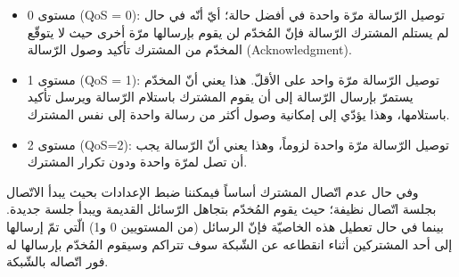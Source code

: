 \begin{itemize}
	\item مستوى 0 (QoS = 0): توصيل الرّسالة مرّة واحدة في أفضل حالة؛ أيّ أنّه في حال لم يستلم المشترك الرّسالة فإنّ المُخدّم لن يقوم بإرسالها مرّة أخرى حيث لا يتوقّع المخدّم من المشترك تأكيد وصول الرّسالة (Acknowledgment).
	
	\item مستوى 1 (QoS = 1): توصيل الرّسالة مرّة واحد على الأقلّ. هذا يعني أنّ المخدّم يستمرّ بإرسال الرّسالة إلى أن يقوم المشترك باستلام الرّسالة ويرسل تأكيد باستلامها، وهذا يؤدّي إلى إمكانية وصول أكثر من رسالة واحدة إلى نفس المشترك.
	
	\item مستوى 2 (QoS=2): توصيل الرّسالة مرّة واحدة لزوماً، وهذا يعني أنّ الرّسالة يجب أن تصل لمرّة واحدة ودون تكرار المشترك.
	
\end{itemize}

وفي حال عدم اتّصال المشترك أساساً فيمكننا ضبط الإعدادات بحيث يبدأ الاتّصال بجلسة اتّصال نظيفة؛ حيث يقوم المُخدّم بتجاهل الرّسائل القديمة ويبدأ جلسة جديدة. بينما في حال تعطيل هذه الخاصيّة فإنّ الرسائل (من المستويين 0 و1) الّتي تمّ إرسالها إلى أحد المشتركين أثناء انقطاعه عن الشّبكة سوف تتراكم وسيقوم المُخدّم بإرسالها له فور اتّصاله بالشّبكة.